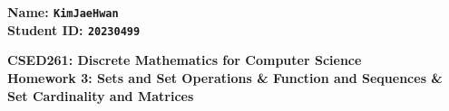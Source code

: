 \documentclass{article}%
\theoremstyle{definition}
\begin{document}
\begin{flushright}
\textbf{Name: \texttt{KimJaeHwan}\\
Student ID: \texttt{20230499}}
\end{flushright}


\begin{center}
\textbf{CSED261: Discrete Mathematics for Computer Science \\
Homework 3: Sets and Set Operations \& Function and Sequences \& Set Cardinality and Matrices} \\
\end{center}







\end{document}

